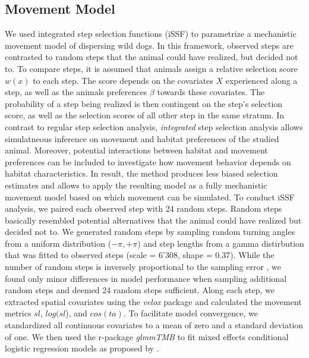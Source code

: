 \documentclass[abstract=on,10pt,a4paper,bibliography=totocnumbered]{article}
\begin{document}
\subsection{Movement Model}
We used integrated step selection functions (iSSF) to parametrize a mechanistic
movement model of dispersing wild dogs. In this framework, observed steps are
contrasted to random steps that the animal could have realized, but decided not
to. To compare steps, it is assumed that animals assign a relative selection
score \(w(x)\) to each step. The score depends on the covariates \(X\)
experienced along a step, as well as the animals preferences \(\beta\) towards
these covariates. The probability of a step being realized is then contingent on
the step's selection score, as well as the selection scores of all other step in
the same stratum. In contrast to regular step selection analysis,
\textit{integrated} step selection analysis allows simulatneous inference on
movement and habitat preferences of the studied animal. Moreover, potential
interactions between habitat and movement preferences can be included to
investigate how movement behavior depends on habitat characteristics. In result,
the method produces less biased selection estimates and allows to apply the
resulting model as a fully mechanistic movement model based on which movement
can be simulated. To conduct iSSF analysis, we paired each observed step with 24
random steps. Random steps basically resembled potential alternatives that the
animal could have realized but decided not to. We generated random steps by
sampling random turning angles from a uniform distribution (\(-\pi, +\pi\)) and
step lengths from a gamma distirbution that was fitted to observed steps (scale
= 6'308, shape = 0.37). While the number of random steps is inversely
proportional to the sampling error \citep{Avgar.2016}, we found only minor
differences in model performance when sampling additional random steps and
deemed 24 random steps sufficient. Along each step, we extracted spatial
covariates using the \textit{velox} package and calculated the movement metrics
\(sl\), \(log(sl\)), and \(cos(ta)\). To facilitate model convergence, we
standardized all continuous covariates to a mean of zero and a standard
deviation of one. We then used the r-package \textit{glmmTMB} to fit mixed
effects conditional logistic regression models as proposed by \citep{Muff.2020}.
\end{document}
